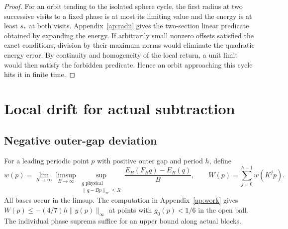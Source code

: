 \documentclass[11pt,reqno]{amsart}
\theoremstyle{remark}
\begin{document}
\begin{proof}
For an orbit tending to the isolated sphere cycle, the first radius at two successive visits to a fixed phase is at most its limiting value and the energy is at least \(s_*\) at both visits. Appendix~\ref{ap:radii} gives the two-section linear predicate obtained by expanding the energy. If arbitrarily small nonzero offsets satisfied the exact conditions, division by their maximum norms would eliminate the quadratic energy error. By continuity and homogeneity of the local return, a unit limit would then satisfy the forbidden predicate. Hence an orbit approaching this cycle hits it in finite time.
\end{proof}

\section{Local drift for actual subtraction}\label{sec:drift}

\subsection{Negative outer-gap deviation}
For a leading periodic point \(p\) with positive outer gap and period \(h\), define
\[
 w(p)=\lim_{R\to\infty}\limsup_{B\to\infty}
 \sup_{\substack{q\text{ physical}\\\|q-Bp\|_\infty\le R}}
 \frac{E_B(F_Bq)-E_B(q)}{B},\qquad
 W(p)=\sum_{j=0}^{h-1}w(K^jp).
\]
All bases occur in the limsup. The computation in Appendix~\ref{ap:work} gives \(W(p)\le -(4/7)h\|y(p)\|_\infty\) at points with \(g_0(p)<1/6\) in the open ball. The individual phase suprema suffice for an upper bound along actual blocks.
\end{document}

